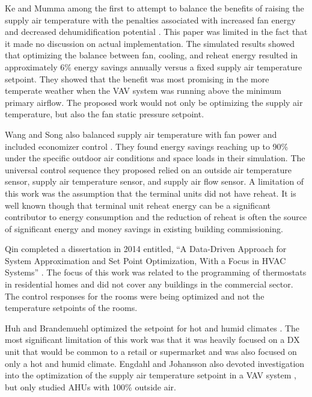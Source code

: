 Ke and Mumma among the first to attempt to balance the benefits of
raising the supply air temperature with the penalties associated with
increased fan energy and decreased dehumidification potential
\cite{Ke1997OptimizedSystems}. This paper was limited in the fact that
it made no discussion on actual implementation. The simulated results
showed that optimizing the balance between fan, cooling, and reheat
energy resulted in approximately 6\% energy savings annually versus a
fixed supply air temperature setpoint. They showed that the benefit was
most promising in the more temperate weather when the VAV system was
running above the minimum primary airflow. The proposed work would not only
be optimizing the supply air temperature, but also the fan static pressure setpoint.   

Wang and Song also balanced supply air temperature with fan power and
included economizer control \cite{Wang2012AirCycles}. They found energy
savings reaching up to 90\% under the specific outdoor air conditions
and space loads in their simulation. The universal control sequence they
proposed relied on an outside air temperature sensor, supply air
temperature sensor, and supply air flow sensor. A limitation of this
work was the assumption that the terminal units did not have reheat. It
is well known though that terminal unit reheat energy can be a
significant contributor to energy consumption and the reduction of
reheat is often the source of significant energy and money savings in
existing building commissioning.  

Qin completed a dissertation in 2014 entitled, ``A Data-Driven Approach
for System Approximation and Set Point Optimization, With a Focus in
HVAC Systems'' \cite{Qin_2014_Res_Letters}. The focus of this work was
related to the programming of thermostats in residential homes and did
not cover any buildings in the commercial sector. The control responses
for the rooms were being optimized and not the temperature setpoints of
the rooms.  

Huh and Brandemuehl optimized the setpoint for hot and humid climates
\cite{Huh2008}. The most significant limitation of this work was that it
was heavily focused on a DX unit that would be common to a retail or
supermarket and was also focused on only a hot and humid climate.
Engdahl and Johansson also devoted investigation into the optimization
of the supply air temperature setpoint in a VAV system
\cite{Engdahl2004}, but only studied AHUs with 100\% outside air. 


